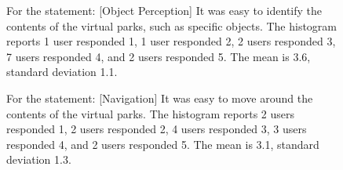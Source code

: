 \begin{figure}[t]
{For the statement: [Object Perception] It was easy to identify the contents of the virtual parks, such as specific objects.
The histogram reports 1 user responded 1, 1 user responded 2, 2 users responded 3, 7 users responded 4, and 2 users responded 5. The mean is 3.6, standard deviation 1.1. 

For the statement: [Navigation] It was easy to move around the contents of the virtual parks.
The histogram reports 2 users responded 1, 2 users responded 2, 4 users responded 3, 3 users responded 4, and 2 users responded 5. The mean is 3.1, standard deviation 1.3. 

}
\end{figure}